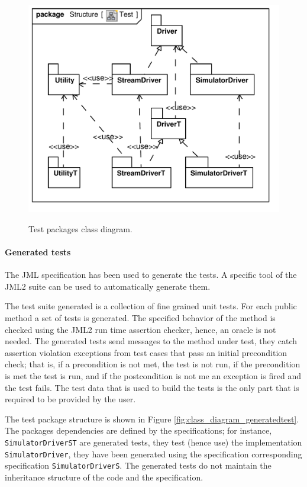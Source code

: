 \documentclass{article} \usepackage{times}
\newcommand{\lil}[1]{\texttt{\lstinline|#1|}}
\begin{document}
\begin{figure}[htb!]
 \centering
 \includegraphics[scale=0.4]{UML_model/Class_Diagram__Structure__Test}
 \label{fig:class_diagram_test}
 \caption{Test packages class diagram.}
\end{figure}

\paragraph*{Generated tests}

The JML specification has been used to generate the tests. 
A specific tool of the JML2 suite can be used to automatically generate 
them\cite{Cheon-Leavens02}.

The test suite generated is a collection of fine grained unit tests.
For each public method a set of tests is generated.
The specified behavior of the method is checked using the JML2 run time 
assertion checker, hence, an oracle is not needed. 
The generated tests send messages to the method under test, they catch 
assertion violation exceptions from test cases that pass an initial 
precondition check; that is, if a precondition is not met, the test is 
not run, if the precondition is met the test is run, and if the postcondition 
is not me an exception is fired and the test fails.
The test data that is used to build the tests is the only part that is 
required to be provided by the user.

The test package structure is shown in Figure 
\ref{fig:class_diagram_generatedtest}.
The packages dependencies are defined by the specifications; for instance, 
\lil{SimulatorDriverST} are generated tests, they test (hence use) the 
implementation \lil{SimulatorDriver}, they have been generated using the 
specification corresponding specification \lil{SimulatorDriverS}.
The generated tests do not maintain the inheritance structure of the code 
and the specification.
\end{document}
